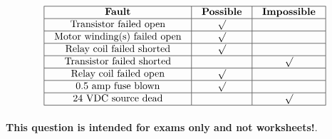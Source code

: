 \vfil 

\eject







$$\vbox{\offinterlineskip
\halign{\strut
\vrule \quad\hfil # \ \hfil & 
\vrule \quad\hfil # \ \hfil & 
\vrule \quad\hfil # \ \hfil \vrule \cr
\noalign{\hrule}
%
{\bf Fault} & {\bf Possible} & {\bf Impossible} \cr
%
\noalign{\hrule}
%
Transistor failed open & $\surd$ &  \cr
%
\noalign{\hrule}
%
Motor winding(s) failed open & $\surd$ &  \cr
%
\noalign{\hrule}
%
Relay coil failed shorted & $\surd$ &  \cr
%
\noalign{\hrule}
%
Transistor failed shorted &  & $\surd$ \cr
%
\noalign{\hrule}
%
Relay coil failed open & $\surd$ &  \cr
%
\noalign{\hrule}
%
0.5 amp fuse blown & $\surd$ &  \cr
%
\noalign{\hrule}
%
24 VDC source dead &  & $\surd$ \cr
%
\noalign{\hrule}
} %
}$$ %







{\bf This question is intended for exams only and not worksheets!}.


